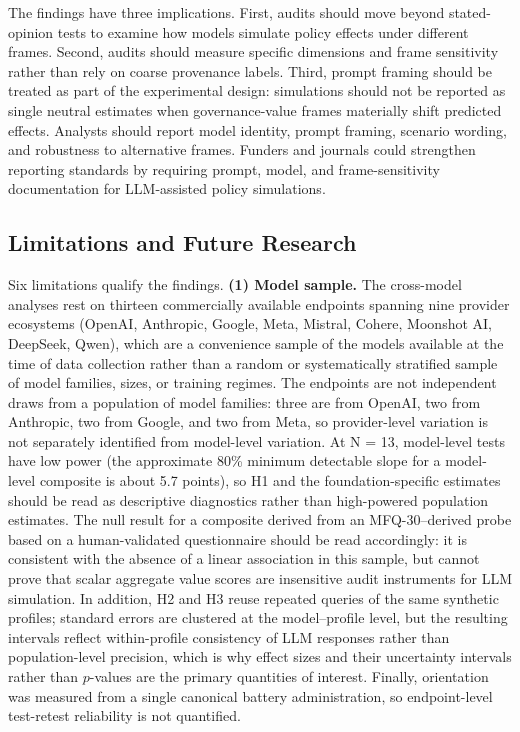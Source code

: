 \documentclass[12pt,a4paper]{article}
\begin{document}
The findings have three implications. First, audits should move beyond stated-opinion tests to examine how models simulate policy effects under different frames. Second, audits should measure specific dimensions and frame sensitivity rather than rely on coarse provenance labels. Third, prompt framing should be treated as part of the experimental design: simulations should not be reported as single neutral estimates when governance-value frames materially shift predicted effects. Analysts should report model identity, prompt framing, scenario wording, and robustness to alternative frames. Funders and journals could strengthen reporting standards by requiring prompt, model, and frame-sensitivity documentation for LLM-assisted policy simulations.

\subsection{Limitations and Future Research}

Six limitations qualify the findings. \textbf{(1) Model sample.} The cross-model analyses rest on thirteen commercially available endpoints spanning nine provider ecosystems (OpenAI, Anthropic, Google, Meta, Mistral, Cohere, Moonshot AI, DeepSeek, Qwen), which are a convenience sample of the models available at the time of data collection rather than a random or systematically stratified sample of model families, sizes, or training regimes. The endpoints are not independent draws from a population of model families: three are from OpenAI, two from Anthropic, two from Google, and two from Meta, so provider-level variation is not separately identified from model-level variation. At N = 13, model-level tests have low power (the approximate 80\% minimum detectable slope for a model-level composite is about 5.7 points), so H1 and the foundation-specific estimates should be read as descriptive diagnostics rather than high-powered population estimates. The null result for a composite derived from an MFQ-30--derived probe based on a human-validated questionnaire should be read accordingly: it is consistent with the absence of a linear association in this sample, but cannot prove that scalar aggregate value scores are insensitive audit instruments for LLM simulation. In addition, H2 and H3 reuse repeated queries of the same synthetic profiles; standard errors are clustered at the model--profile level, but the resulting intervals reflect within-profile consistency of LLM responses rather than population-level precision, which is why effect sizes and their uncertainty intervals rather than $p$-values are the primary quantities of interest. Finally, orientation was measured from a single canonical battery administration, so endpoint-level test-retest reliability is not quantified.
\end{document}
